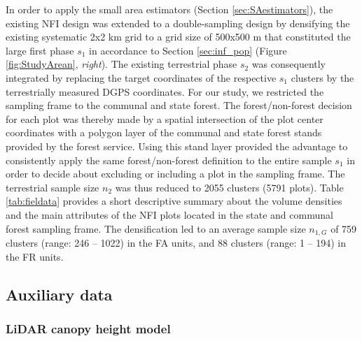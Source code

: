 \documentclass[remotesensing,article,submit,moreauthors,pdftex,10pt,a4paper]{mdpi}
\begin{document}
In order to apply the small area estimators (Section \ref{sec:SAestimators}), the existing NFI design was extended to a double-sampling design by densifying the existing systematic 2x2 km grid to a grid size of 500x500 m that constituted the large first phase $s_1$ in accordance to Section \ref{sec:inf_pop} (Figure \ref{fig:StudyArean}, \textit{right}). The existing terrestrial phase $s_2$ was consequently integrated by replacing the target coordinates of the respective $s_1$ clusters by the terrestrially measured DGPS coordinates. For our study, we restricted the sampling frame to the communal and state forest. The forest/non-forest decision for each plot was thereby made by a spatial intersection of the plot center coordinates with a polygon layer of the communal and state forest stands provided by the forest service. Using this stand layer provided the advantage to consistently apply the same forest/non-forest definition to the entire sample $s_1$ in order to decide about excluding or including a plot in the sampling frame. The terrestrial sample size $n_2$ was thus reduced to 2055 clusters (5791 plots). Table \ref{tab:fieldata} provides a short descriptive summary about the volume densities and the main attributes of the NFI plots located in the state and communal forest sampling frame. The densification led to an average sample size $n_{1,G}$ of 759  clusters (range: 246 -- 1022) in the FA units, and 88 clusters (range: 1 -- 194) in the FR units.




\subsection{Auxiliary data}
\label{sec:auxinfo}

\subsubsection{LiDAR canopy height model}
\label{sec:chm}
\end{document}
